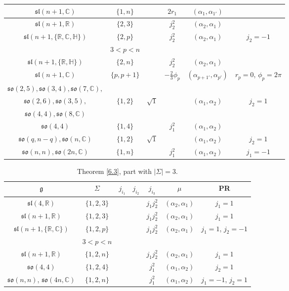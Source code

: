 \documentclass[10pt,a4paper]{amsart}
\newcommand{\Si}{\Sigma}
\newcommand{\fg}{\mathfrak g}
\newcommand{\R}{\mathbb{R}}
\newcommand{\C}{\mathbb{C}}
\numberwithin{equation}{section}
\begin{document}
\begin{table}[th!]
\begin{tabular}{|c|c|c|c|c|c|}
\hline
$\mathfrak{sl}(n+1,\mathbb{C})$ &$\{1,n\}$&& $2r_1$& $(\alpha_{1},\alpha_{1'})$& \\
\hline
$\mathfrak{sl}(n+1,\R)$ & $\{2,3\}$ &&$j_2^2$ & $(\alpha_2,\alpha_1)$ &\\
\hline
$\mathfrak{sl}(n+1,\{\R,\C,\mathbb{H}\})$ & $\{2,p\}$ &&$j_2^2$ & $(\alpha_2,\alpha_1)$ & $j_2=-1$\\
& $3<p<n$& & &&\\
\hline
$\mathfrak{sl}(n+1,\{\R,\mathbb{H}\})$ & $\{2,n\}$ &&$j_2^2$ & $(\alpha_2,\alpha_1)$ & \\
\hline
$\mathfrak{sl}(n+1,\mathbb{C})$& $\{p,p+1\}$ && $-\frac23\phi_p$& $ (\alpha_{p+1'},\alpha_{p'})$& $r_p=0$, $\phi_p=2\pi$ \\

\hline
$\mathfrak{so}(2,5),\mathfrak{so}(3,4),\mathfrak{so}(7,\C),$&&&& & \\
$\mathfrak{so}(2,6),\mathfrak{so}(3,5),$&$\{ 1,2\}$&$\sqrt{1} $&& $(\alpha_1,\alpha_2)$ &$j_2=1$ \\
$\mathfrak{so}(4,4),\mathfrak{so}(8,\C)$& & & & &\\
\hline
$\mathfrak{so}(4,4)$&$\{ 1,4\}$& & $j_1^2$& $(\alpha_1,\alpha_2)$ & \\
\hline
$\mathfrak{so}(q,n-q),\mathfrak{so}(n,\C)$&$\{ 1,2\}$&$\sqrt{1} $&& $(\alpha_1,\alpha_2)$ &$j_2=1$ \\
\hline
$\mathfrak{so}(n,n), \mathfrak{so}(2n,\C)$&$\{ 1,n\}$& & $j_1^2$& $(\alpha_1,\alpha_2)$ &$j_1=-1$ \\
\hline
\end{tabular}
\end{table}

\begin{table}[th!]\centering \caption{Theorem \ref{6.3}, part with $|\Si|=3$.}\label{ahs3}\vspace{1mm}

\begin{tabular}{|c|c|c|c|c|c|c|}
\hline
$\fg$ & $\Sigma$ & $j_{i_1}$& $j_{i_2}$& $j_{i_3}$&$\mu$&PR \\
\hline
\hline
$\mathfrak{sl}(4,\mathbb{R})$ &$\{1,2,3\}$& & & $j_1j_2^2 $ &$(\alpha_2,\alpha_1)$& $j_1=1$\\
\hline
$\mathfrak{sl}(n+1,\mathbb{R})$ &$\{1,2,3\}$& & & $j_1j_2^2 $ &$(\alpha_2,\alpha_1)$& $j_1=1$ \\
\hline
$\mathfrak{sl}(n+1,\{\mathbb{R},\C\})$ &$\{1,2,p\}$& & & $j_1j_2^2 $ &$(\alpha_2,\alpha_1)$& $j_1=1$, $j_2=-1$ \\
& $3<p<n$& & &&&\\
\hline
$\mathfrak{sl}(n+1,\mathbb{R})$ &$\{1,2,n\}$& & & $j_1j_2^2 $ &$(\alpha_2,\alpha_1)$& $j_1=1$ \\
\hline
$\mathfrak{so}(4,4)$& $\{1,2,4\}$&&& $j_1^2 $&$(\alpha_1,\alpha_2)$& $j_2=1$\\
\hline
$\mathfrak{so}(n,n)$, $\mathfrak{so}(4n,\mathbb{C})$& $\{1,2,n\}$&&& $j_1^2 $&$(\alpha_1,\alpha_2)$& $j_1=-1$, $j_2=1$\\
\hline
\end{tabular}
\end{table}
\end{document}
